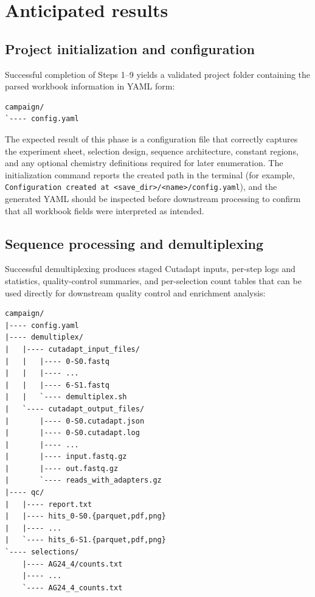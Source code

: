 \documentclass[pdflatex,sn-nature]{sn-jnl}
\begin{document}

\section{Anticipated results}

\subsection{Project initialization and configuration}
Successful completion of Steps 1--9 yields a validated project folder containing the parsed workbook information in YAML form:

\begin{lstlisting}
campaign/
`---- config.yaml
\end{lstlisting}

The expected result of this phase is a configuration file that correctly captures the experiment sheet, selection design, sequence architecture, constant regions, and any optional chemistry definitions required for later enumeration. The initialization command reports the created path in the terminal (for example, \texttt{Configuration created at <save\_dir>/<name>/config.yaml}), and the generated YAML should be inspected before downstream processing to confirm that all workbook fields were interpreted as intended.

\subsection{Sequence processing and demultiplexing}
Successful demultiplexing produces staged Cutadapt inputs, per-step logs and statistics, quality-control summaries, and per-selection count tables that can be used directly for downstream quality control and enrichment analysis:

\begin{lstlisting}
campaign/
|---- config.yaml
|---- demultiplex/
|   |---- cutadapt_input_files/
|   |   |---- 0-S0.fastq
|   |   |---- ...
|   |   |---- 6-S1.fastq
|   |   `---- demultiplex.sh
|   `---- cutadapt_output_files/
|       |---- 0-S0.cutadapt.json
|       |---- 0-S0.cutadapt.log
|       |---- ...
|       |---- input.fastq.gz
|       |---- out.fastq.gz
|       `---- reads_with_adapters.gz
|---- qc/
|   |---- report.txt
|   |---- hits_0-S0.{parquet,pdf,png}
|   |---- ...
|   `---- hits_6-S1.{parquet,pdf,png}
`---- selections/
    |---- AG24_4/counts.txt
    |---- ...
    `---- AG24_4_counts.txt
\end{lstlisting}
\end{document}
